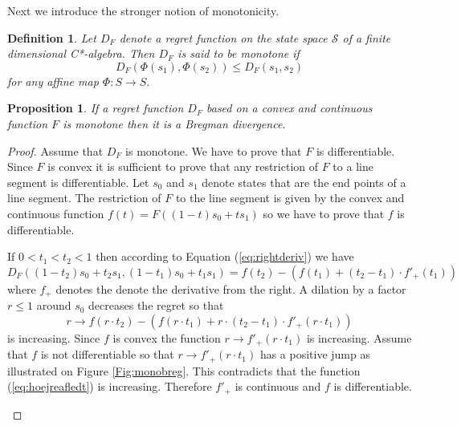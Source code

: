 \documentclass[10pt,a4paper,draft]{article}
\newtheorem{Prop}{Proposition}
\newtheorem{Definition}{Definition}
\begin{document}
Next we introduce the stronger notion of monotonicity. 
\begin{Definition}
Let $D_{F}$ denote a regret function on the state space $\mathcal{S}$ of a finite dimensional C*-algebra. Then $D_{F}$ is said to be \emph{monotone} if 
\[
D_{F}\left(\Phi\left(s_{1}\right),\Phi\left(s_{2}\right)\right)\leq
D_{F}\left(s_{1},s_{2}\right)
\]
for any affine map $\Phi:S\to S.$ 
\end{Definition}
\begin{Prop}\label{prop:monoBreg}
If a regret function $D_F$ based on a convex and continuous function $F$ is monotone then it is a Bregman divergence.
\end{Prop}
\begin{proof}
Assume that $D_F$ is monotone. We have to prove that $F$ is differentiable. Since $F$ is convex it is sufficient to prove that any restriction of $F$  to a line segment is differentiable. Let $s_0$ and $s_1$ denote states that are the end points of a line segment. The restriction of $F$ to the line segment is given by the convex and continuous function $f(t)= F((1-t)s_0 +ts_1 )$ so we have to prove that $f$ is differentiable.

If $0<t_1 <t_2 <1$ then according to Equation (\ref{eq:rightderiv}) we have
\[
D_{F}\left((1-t_2 )s_{0} +t_2 s_{1} ,(1-t_1 )s_{0} +t_1 s_{1} \right)=f\left(t_2 \right)-\left(f\left(t_1 \right)+\left(t_2 - t_1\right)\cdot f'_+ \left( t_1 \right) \right)
\]
where $f_+$ denotes the denote the derivative from the right. A dilation by a factor $r\leq 1$ around $s_0$ decreases the regret so that 
\begin{equation}
r\to f\left(r\cdot t_2 \right)-\left(f\left(r\cdot t_1 \right)+r\cdot\left(t_2 - t_1\right)\cdot f'_+ \left(r\cdot t_1 \right) \right) \label{eq:hoejreafledt}
\end{equation}
is increasing. Since $f$ is convex the function $r\to f'_+ \left(r\cdot t_1 \right)$ is increasing. Assume that $f$ is not differentiable so that $r\to f'_+ \left(r\cdot t_1 \right)$ has a positive jump as illustrated on Figure \ref{Fig:monobreg}. This contradicts that the function (\ref{eq:hoejreafledt}) is increasing. Therefore $f'_+$ is continuous and $f$ is differentiable.
\begin{figure}
\begin{centering}
\end{centering}
\end{figure}
\end{proof}
\end{document}
